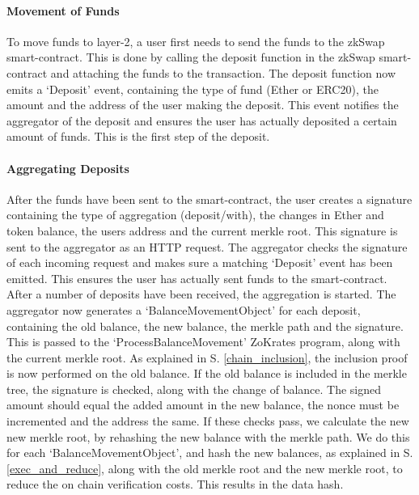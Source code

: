 \documentclass[../../thesis.tex]{subfiles}
\begin{document}
\paragraph{Movement of Funds}
To move funds to layer-2, a user first needs to send the funds to the zkSwap smart-contract. This is done by calling the deposit function in the zkSwap smart-contract and attaching the funds to the transaction. The deposit function now emits a `Deposit' event, containing the type of fund (Ether or ERC20), the amount and the address of the user making the deposit. This event notifies the aggregator of the deposit and ensures the user has actually deposited a certain amount of funds. This is the first step of the deposit.

\paragraph{Aggregating Deposits} \label{aggr_deps}
After the funds have been sent to the smart-contract, the user creates a signature containing the type of aggregation (deposit/with), the changes in Ether and token balance, the users address and the current merkle root. This signature is sent to the aggregator as an HTTP request. The aggregator checks the signature of each incoming request and makes sure a matching `Deposit' event has been emitted. This ensures the user has actually sent funds to the smart-contract. After a number of deposits have been received, the aggregation is started. The aggregator now generates a `BalanceMovementObject' for each deposit, containing the old balance, the new balance, the merkle path and the signature. This is passed to the `ProcessBalanceMovement' ZoKrates program, along with the current merkle root. As explained in S. \ref{chain_inclusion}, the inclusion proof is now performed on the old balance. If the old balance is included in the merkle tree, the signature is checked, along with the change of balance. The signed amount should equal the added amount in the new balance, the nonce must be incremented and the address the same. If these checks pass, we calculate the new new merkle root, by rehashing the new balance with the merkle path. We do this for each `BalanceMovementObject', and hash the new balances, as explained in S. \ref{exec_and_reduce}, along with the old merkle root and the new merkle root, to reduce the on chain verification costs. This results in the data hash. 
\end{document}
